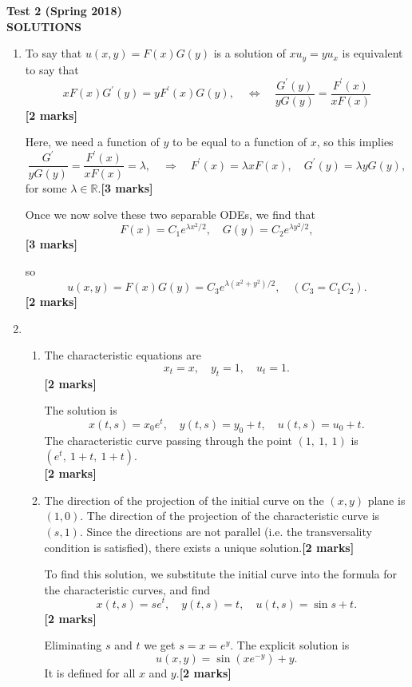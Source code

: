 \documentclass[11pt,a4paper]{article}
\newcommand{\mrk}[1]{\hfill\textbf{[#1 marks]}}
\begin{document}
	\begin{center}
		\textbf{\large Test 2 (Spring 2018)}\\[0.15cm]
		\textbf{\large SOLUTIONS}
	\end{center}
	\begin{enumerate}
		\item To say that $u(x, y) = F(x)G(y)$ is a solution of $xu_y = yu_x$ is equivalent to say that
		$$
		xF(x)G^\prime(y) = yF^\prime(x)G(y),\quad \Leftrightarrow \quad \frac{G^\prime(y)}{yG(y)} = \frac{F^\prime(x)}{xF(x)}
		$$
		\mrk{2}\par
		Here, we need a function of $y$ to be equal to a function of $x$, so this implies
		$$
		\frac{G^\prime}{yG(y)} = \frac{F^\prime(x)}{xF(x)} = \lambda,\quad \Rightarrow \quad F^\prime(x) = \lambda xF(x),\quad G^\prime(y) = \lambda yG(y),
		$$
		for some $\lambda \in \mathbb{R}$.\mrk{3}\par
		Once we now solve these two separable ODEs, we find that
		$$
		F(x) = C_1e^{\lambda x^2/2},\quad G(y) = C_2e^{\lambda y^2/2},
		$$
		\mrk{3}\par
		so
		$$
		u(x, y) = F(x)G(y) = C_3e^{\lambda(x^2 + y^2)/2},\quad (C_3 = C_1C_2).
		$$
		\mrk{2}
		\item 
		\begin{enumerate}
			\item The characteristic equations are
			$$
			x_t = x,\quad y_t = 1,\quad u_t = 1.
			$$
			\mrk{2}\par 
			The solution is
			$$
			x(t, s) = x_0e^t,\quad y(t, s) = y_0 + t,\quad u(t, s) = u_0 + t.
			$$
			The characteristic curve passing through the point $(1,\ 1,\ 1)$ is $(e^t,\ 1 + t,\ 1 + t)$.\\
			\vspace*{0ex}\mrk{2}
			\item The direction of the projection of the initial curve on the $(x, y)$ plane is $(1, 0)$. The direction of the projection of the characteristic curve is $(s, 1)$. Since the directions are not parallel (i.e. the transversality condition is satisfied), there exists a unique solution.\mrk{2}\par
			To find this solution, we substitute the initial curve into the formula for the characteristic curves, and find
			$$
			x(t, s) = se^t,\quad y(t,s) = t,\quad u(t, s) = \sin s + t.
			$$
			\mrk{2}\par
			Eliminating $s$ and $t$ we get $s = x = e^y$. The explicit solution is
			$$
			u(x, y) = \sin(xe^{-y}) + y.
			$$
			It is defined for all $x$ and $y$.\mrk{2}

\end{enumerate}
\end{enumerate}
\end{document}
